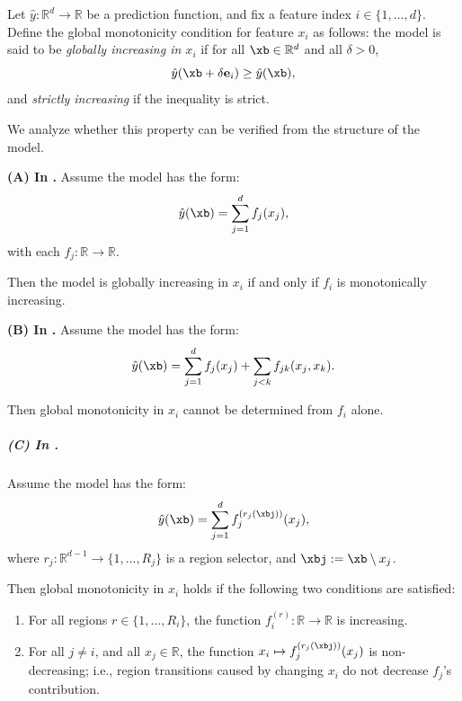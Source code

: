 \begin{proposition}

Let \( \hat{y} : \mathbb{R}^d \to \mathbb{R} \) be a prediction function, and fix a feature index \( i \in \{1, \dots, d\} \). Define the global monotonicity condition for feature \( x_i \) as follows: the model is said to be \emph{globally increasing in \( x_i \)} if for all \( \xb \in \mathbb{R}^d \) and all \( \delta > 0 \),
\[
\hat{y}(\xb + \delta \mathbf{e}_i) \ge \hat{y}(\xb),
\]
and \emph{strictly increasing} if the inequality is strict.

We analyze whether this property can be verified from the structure of the model.

\textbf{(A) In \gam.}
Assume the model has the form:
\[
\hat{y}(\xb) = \sum_{j=1}^d f_j(x_j),
\]
with each \( f_j : \mathbb{R} \to \mathbb{R} \).

Then the model is globally increasing in \( x_i \) if and only if \( f_i \) is monotonically increasing.

\textbf{(B) In \gamm.}
Assume the model has the form:
\[
\hat{y}(\xb) = \sum_{j=1}^d f_j(x_j) + \sum_{j<k} f_{jk}(x_j, x_k).
\]

Then global monotonicity in \( x_i \) cannot be determined from \( f_i \) alone.

\subparagraph{(C) In \method{}.}
Assume the model has the form:
\[
\hat{y}(\xb) = \sum_{j=1}^d f_j^{(r_j(\xbj))}(x_j),
\]
where \( r_j : \mathbb{R}^{d-1} \to \{1, \dots, R_j\} \) is a region selector, and \( \xbj := \xb \setminus x_j \).

Then global monotonicity in \( x_i \) holds  if the following two conditions are satisfied:
\begin{enumerate}
  \item For all regions \( r \in \{1, \dots, R_i\} \), the function \( f_i^{(r)} : \mathbb{R} \to \mathbb{R} \) is increasing.
  \item For all \( j \ne i \), and all \( x_j \in \mathbb{R} \), the function \( x_i \mapsto f_j^{(r_j(\xbj))}(x_j) \) is non-decreasing; i.e., region transitions caused by changing \( x_i \) do not decrease \( f_j \)'s contribution.
\end{enumerate}

\end{proposition}

